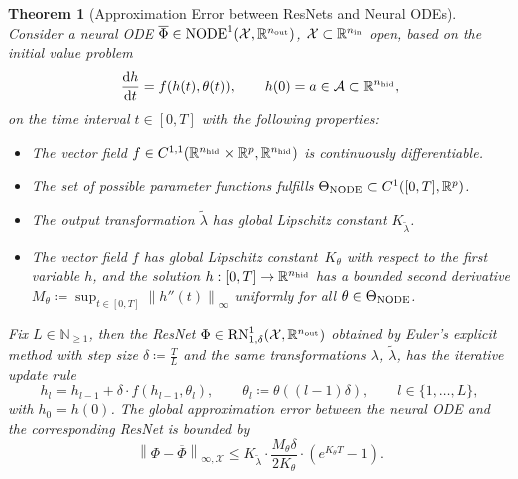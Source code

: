 \documentclass[10pt]{article}
\newtheorem{theorem}{Theorem}[section]
\theoremstyle{definition}
\numberwithin{equation}{section}
\newcommand\norm[1]{\left\lVert#1\right\rVert}
\newcommand{\R}{\mathbb{R}}
\newcommand*{\dd}{\mathrm{d}}
\newcommand*{\nout}{n_\textup{out}}
\newcommand*{\nhid}{n_\textup{hid}}
\newcommand*{\nin}{n_\textup{in}}
\begin{document}
\begin{theorem}[Approximation Error between ResNets and Neural ODEs] \label{th:eulerdiscretization}
	Consider a neural ODE $\overline{\Phi} \in \textup{NODE}^1(\mathcal{X},\R^{\nout})$, $\mathcal{X} \subset \R^{\nin}$ open, based on the initial value problem 
	\begin{equation} \label{eq:IVP2}
		\frac{\dd h}{\dd t} = f(h(t),\theta(t)), \qquad h(0) = a \in \mathcal{A} \subset \R^{\nhid},
	\end{equation}
	on the time interval $t\in[0,T]$ with the following properties:
	\begin{itemize}
		\item The vector field $f\in C^{1,1}(\R^{\nhid} \times \R^p,\R^{\nhid})$ is continuously differentiable.
        \item The set of possible parameter functions fulfills $ \Theta_{\textup{NODE}}\subset  C^1([0,T],\R^p)$. 
		\item The output transformation $\tilde{\lambda}$ has global Lipschitz constant $K_{\tilde{\lambda}}$.
		\item The vector field $f$ has global Lipschitz constant~$K_\theta$ with respect to the first variable $h$, and the solution $h: [0,T] \rightarrow \R^{\nhid}$ has a bounded second derivative  $M_\theta \coloneqq \sup_{t \in [0,T]} \norm{h''(t)}_\infty$ uniformly for all $\theta \in \Theta_{\textup{NODE}}$. 
	\end{itemize}
	Fix $L \in \mathbb{N}_{\geq 1}$, then the ResNet $\Phi \in \textup{RN}^1_{1,\delta}(\mathcal{X},\R^{\nout})$ obtained by Euler's explicit method with step size $\delta \coloneqq \frac{T}{L}$ and the same transformations $\lambda$, $\tilde{\lambda}$, has the iterative update rule
	\begin{equation*}
		h_{l} = h_{l-1} + \delta \cdot f(h_{l-1},\theta_{l}), \qquad \theta_{l} \coloneqq \theta((l-1)\delta), \qquad l \in \{1,\ldots, L\},
	\end{equation*}
	with $h_0 = h(0)$. The global approximation error between the neural ODE and the corresponding ResNet is bounded by
	\begin{equation}  \label{eq:node_resnet_error}
		\norm{\Phi-\overline{\Phi}}_{\infty,\mathcal{X}}  \leq K_{\tilde{\lambda}} \cdot \frac{M_\theta \delta }{2K_\theta}\cdot \left(e^{K_\theta T}-1\right).
	\end{equation}
\end{theorem}
\end{document}
